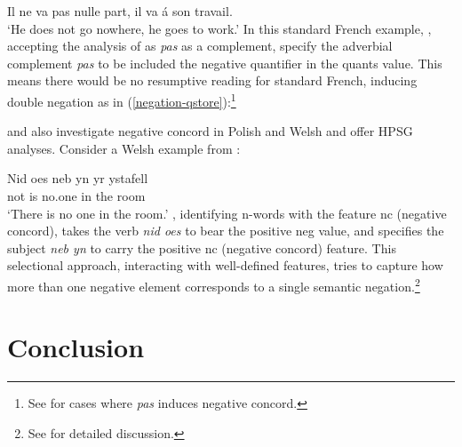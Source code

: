 \documentclass[output=paper
                ,modfonts
                ,nonflat
	        ,collection
	        ,collectionchapter
	        ,collectiontoclongg
 	        ,biblatex
                ,babelshorthands
                ,newtxmath
                ,draftmode
                ,colorlinks, citecolor=brown
]{./langsci/langscibook}
\begin{document}
{\begin{exe}
\begin{xlist}
\ea
Il ne va pas nulle part, il va \'{a} son travail.\\
`He does not go nowhere, he goes to work.'
\z
%
In this standard French example, \citet{Swart:02}, accepting
the analysis of \citet{Kim:00} as \textit{pas} as a complement,
specify the adverbial complement {\it pas} to be included the negative quantifier in the {\sc quants} value.
 This means there would be no resumptive
reading for standard French, inducing double negation as in (\ref{negation-qstore}):\footnote{See \citet{Swart:02} for cases where \textit{pas} induces negative concord.}

\ea
\label{negation-qstore}
\z

\citet{PK:99} and \citet{BJ:00} also  investigate negative concord in Polish and Welsh
and offer HPSG analyses. Consider a Welsh example from \citet{BJ:00}:

\ea
\gll Nid         oes neb yn yr ystafell\\
{\sc not}    is no.one in the room\\
\glt `There is no one in the room.'
\z
\noindent \citet{BJ:00}, identifying n-words with the feature
{\sc nc} (negative
concord),  takes the verb {\it nid oes} to bear the positive {\sc neg} value,
and specifies the subject {\it neb yn} to carry the positive {\sc nc} (negative
concord) feature. This selectional approach, interacting with 
well-defined features, tries to capture how more than one
negative element corresponds to a single semantic negation.\footnote{See
\citet{BJ:00} for detailed discussion.}



\section{Conclusion}





\end{xlist}
\end{exe}}
\end{document}
